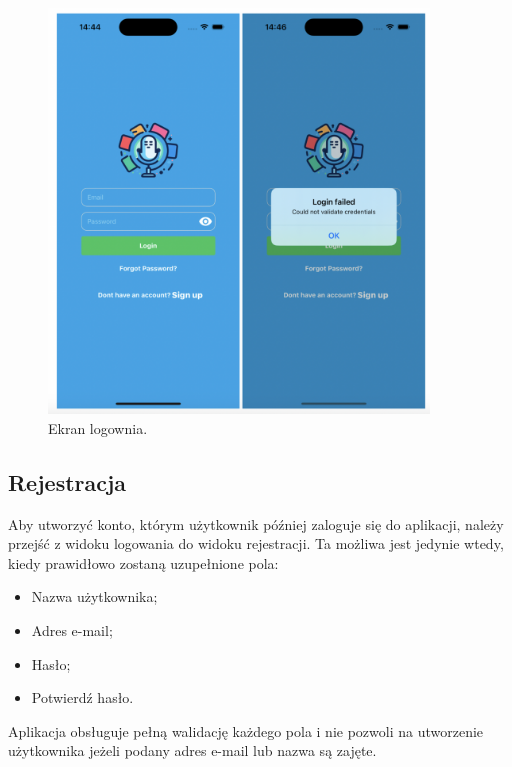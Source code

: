 \begin{figure}[H]
    \centering
    \includegraphics[width=0.9\textwidth]{chapters/chapter_10/images_mobile/mobile_login}
    \caption{Ekran logownia.}
    \label{img:mobile_login}
\end{figure}


\subsection{Rejestracja}
Aby utworzyć konto, którym użytkownik później zaloguje się do aplikacji, należy przejść z widoku logowania do widoku rejestracji. Ta możliwa jest jedynie wtedy, kiedy prawidłowo zostaną uzupełnione pola:
\begin{itemize}
    \item Nazwa użytkownika;
    \item Adres e-mail;
    \item Hasło;
    \item Potwierdź hasło.
\end{itemize}
Aplikacja obsługuje pełną walidację każdego pola i nie pozwoli na utworzenie użytkownika jeżeli podany adres e-mail lub nazwa są zajęte.


